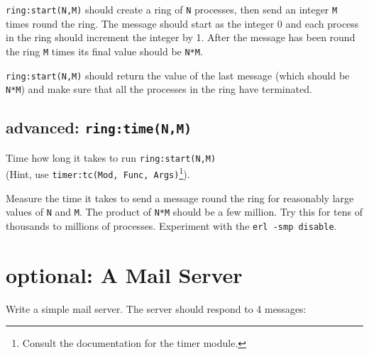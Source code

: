 \documentclass[12pt]{hitec}
\begin{document}
\verb+ring:start(N,M)+ should create a ring of \verb+N+ processes,
then send an integer \verb+M+ times round the ring. The message should
start as the integer 0 and each process in the ring should increment
the integer by 1.  After the message has been round the ring \verb+M+
times its final value should be \verb+N*M+. 

\verb+ring:start(N,M)+ should return the value of the last message
(which should be \verb+N*M+) and make sure that all the processes in
the ring have terminated.

\subsection{advanced: \texttt{ring:time(N,M)}}

Time how long it takes to run \verb+ring:start(N,M)+\\
(Hint, use
\verb+timer:tc(Mod, Func, Args)+\footnote{Consult the documentation for
  the timer module.}).

Measure the time it takes to send a message round the ring for
reasonably large values of \verb+N+ and \verb+M+. The product
of \verb+N*M+ should be a few million. Try this for tens of thousands to
millions of processes. Experiment with the \verb+erl -smp disable+.

\section{optional: A Mail Server}

Write a simple mail server. The server should respond to 4 messages:
\end{document}
